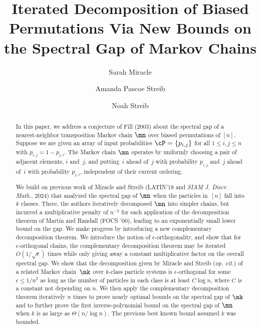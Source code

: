 \documentclass{toc}
\begin{document}
\begin{frontmatter}%

%
%
%

%
\title{Iterated Decomposition of Biased Permutations Via New Bounds on the Spectral Gap of Markov Chains}  %

%
%

%
%
%
%
%
%

%
%
%
%
%
%
%
%
%
%
%
%


%
%
%
%

%


\author[miracle]{Sarah Miracle}
\author[streibA]{Amanda Pascoe Streib}
\author[streibN]{Noah Streib}

%
%
%
%

%
%
%
%
%
%
%
%
\begin{abstract}
In this paper, we address a conjecture of Fill (2003) about the 
spectral gap of a nearest-neighbor transposition Markov chain $\mn$ 
over biased permutations of $[n]$.  Suppose we are given
%
an array  %
of input probabilities $\cP = \{p_{i,j}\}$ 
for all $1 \leq i, j \leq n$ with $p_{i, j} = 1-p_{j, i}$.  The Markov chain $\mn$ operates by uniformly choosing a 
pair of adjacent elements, $i$ and~$j$, and putting~$i$ ahead of~$j$ 
with probability $p_{i,j}$ and~$j$ ahead of~$i$ with probability 
$p_{j,i}$, independent of their current ordering.  

We build on previous work of Miracle and Streib 
(LATIN'18 and \emph{SIAM J. Discr. Math.}, 2024)  %
that analyzed the spectral gap of $\mn$ when the particles in~$[n]$ 
fall into $k$ classes.  There, the authors iteratively decomposed $\mn$ 
into simpler
%
chains, but incurred a multiplicative penalty of $n^{-2}$ for each 
application of the decomposition theorem of Martin and Randall (FOCS '00), 
leading to an 
exponentially small lower bound on the gap. We make progress by 
introducing a new complementary decomposition theorem.
%
We introduce the notion of $\epsilon$-orthogonality, and show that for 
$\epsilon$-orthogonal chains, the complementary decomposition theorem 
may be iterated $O(1/\sqrt{\epsilon})$ times while only giving away a constant 
multiplicative factor on the overall spectral gap.  We show
that  %
the decomposition given by Miracle and Streib
%
(\emph{op. cit.})  %
of a related Markov chain~$\mk$ over 
$k$-class particle systems is  %
$\epsilon$-orthogonal %
for some  %
$\epsilon\leq 1/n^2$ %
%
as long as  %
the number of 
particles in each class is at least $C \log n$, where $C$ is a constant
not depending on $n$.  We then apply the 
complementary decomposition theorem iteratively $n$ times to prove 
nearly optimal bounds on the spectral gap of $\mk$ and to further prove 
the first inverse-polynomial bound on the spectral gap of $\mn$ when $k$ is as 
large as $\Theta(n/\log n)$. The previous best known bound assumed $k$ 
was %
bounded.  %
\end{abstract}


\end{frontmatter}
\end{document}
